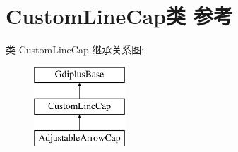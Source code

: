 \hypertarget{class_custom_line_cap}{}\section{Custom\+Line\+Cap类 参考}
\label{class_custom_line_cap}
类 Custom\+Line\+Cap 继承关系图\+:\begin{figure}[H]
\begin{center}
\leavevmode
\includegraphics[height=3.000000cm]{class_custom_line_cap}
\end{center}
\end{figure}
